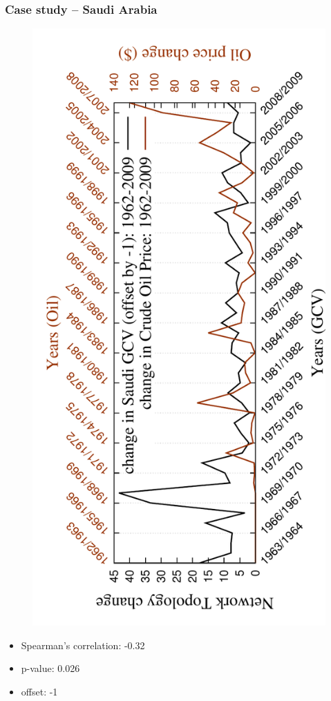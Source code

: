 \documentclass[11pt,xcolor=table]{beamer}
\begin{document}
\begin{frame}
  \frametitle{Case study -- Saudi Arabia}
  
  \begin{figure}
   \vspace{-0.25in}
   \includegraphics[angle=-90,scale=0.45]{../code/extra_results/saudi_oil/saudi_norm1_gcv_oil2}
  \end{figure}

  \begin{itemize}
   \item Spearman's correlation: -0.32
   \item p-value: 0.026
   \item offset: -1
  \end{itemize}

  
\end{frame}
\end{document}
